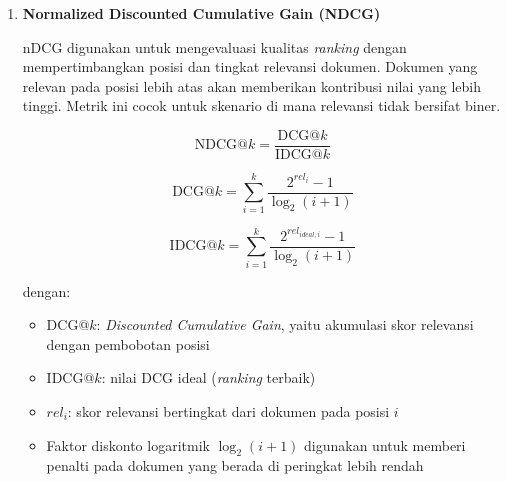 \begin{enumerate}
	\textit{Mean Average Precision} (MAP@k) digunakan untuk mengukur kualitas peringkat dengan mempertimbangkan posisi seluruh dokumen relevan yang berhasil ditemukan dalam top-$k$ hasil \textit{retrieval}. MAP@k menghitung rata-rata \textit{precision} pada setiap posisi di mana dokumen relevan ditemukan, kemudian dinormalisasi terhadap jumlah total \textit{ground truth}. Metrik ini bersifat \textit{rank-sensitive} karena memberikan bobot lebih tinggi pada dokumen relevan yang ditemukan di posisi atas. Semakin tinggi nilai MAP@k, maka semakin baik kemampuan sistem dalam menempatkan dokumen relevan pada posisi peringkat yang lebih tinggi.

	\begin{equation}
		\text{MAP@}k = \frac{1}{|G|} \sum_{i=1}^{k} P(i) \cdot \text{rel}(i)
	\end{equation}

	dengan:
	\begin{itemize}
		\item $|G|$ = jumlah total dokumen relevan (\textit{ground truth})
		\item $P(i)$ = \textit{precision} pada posisi ke-$i$, yaitu $\frac{\text{jumlah dokumen relevan dalam top-}i}{i}$
		\item $\text{rel}(i)$ = 1 jika dokumen pada posisi ke-$i$ relevan, 0 jika tidak
	\end{itemize}

	\item \textbf{Normalized Discounted Cumulative Gain (NDCG)}

	nDCG digunakan untuk mengevaluasi kualitas \textit{ranking} dengan mempertimbangkan posisi dan tingkat relevansi dokumen. Dokumen yang relevan pada posisi lebih atas akan memberikan kontribusi nilai yang lebih tinggi. Metrik ini cocok untuk skenario di mana relevansi tidak bersifat biner.

	\begin{equation}
		\text{NDCG@}k = \frac{\text{DCG@}k}{\text{IDCG@}k}
	\end{equation}

	\begin{equation}
		\text{DCG@}k = \sum_{i=1}^{k} \frac{2^{rel_i} - 1}{\log_2(i+1)}
	\end{equation}

	\begin{equation}
		\text{IDCG@}k = \sum_{i=1}^{k} \frac{2^{rel_{ideal,i}} - 1}{\log_2(i+1)}
	\end{equation}

	dengan:
	\begin{itemize}
		\item DCG@$k$: \textit{Discounted Cumulative Gain}, yaitu akumulasi skor relevansi dengan pembobotan posisi
		\item IDCG@$k$: nilai DCG ideal (\textit{ranking} terbaik)
		\item $rel_i$: skor relevansi bertingkat dari dokumen pada posisi $i$
		\item Faktor diskonto logaritmik $\log_2(i + 1)$ digunakan untuk memberi penalti pada dokumen yang berada di peringkat lebih rendah
	\end{itemize}


\end{enumerate}
